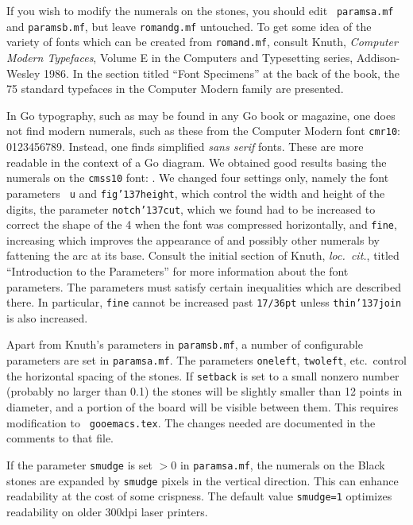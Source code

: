 If you wish to modify the numerals on the stones, you should edit {\tt
paramsa.mf} and {\tt paramsb.mf}, but leave {\tt romandg.mf} untouched. To get
some idea of the variety of fonts which can be created from {\tt romand.mf},
consult Knuth, {\it Computer Modern Typefaces}, Volume E in the Computers and
Typesetting series, Addison-Wesley 1986. In the section titled ``Font
Specimens'' at the back of the book, the 75 standard typefaces in the Computer
Modern family are presented.

In Go typography, such as may be found in any Go book or
magazine, one does not find modern numerals, such as these from the Computer
Modern font {\tt cmr10}: 0123456789. Instead, one finds simplified {\it sans
serif\/} fonts. These are more readable in the context of a Go diagram. We
obtained good results basing the numerals on the {\tt cmss10} font: {}.  We changed four settings only, namely the font parameters {\tt
u} and {\tt fig\char'137height}, which control the width and height of the
digits, the parameter {\tt notch\char'137cut}, which we found had to be
increased to correct the shape of the 4 when the font was compressed
horizontally, and {\tt fine}, increasing which improves the appearance
of  and possibly other numerals by fattening the
arc at its base. Consult the initial section of Knuth, {\it loc.\ cit.},
titled ``Introduction to the Parameters'' for more information about the font
parameters. The parameters must satisfy certain inequalities which are
described there. In particular, {\tt fine} cannot be increased past 
{\tt 17/36pt} unless {\tt thin\char'137join} is also increased.

Apart from Knuth's parameters in {\tt paramsb.mf}, a number of configurable
parameters are set in {\tt paramsa.mf}. The parameters {\tt oneleft}, 
{\tt twoleft}, etc.\ control the horizontal spacing of the stones. If 
{\tt setback} is set to a small nonzero number (probably no larger than 0.1)
the stones will be slightly smaller than 12 points in diameter, and a portion
of the board will be visible between them. This requires modification to {\tt
gooemacs.tex}.  The changes needed are documented in the comments to that
file. 

If the parameter {\tt smudge} is set $>0$ in {\tt paramsa.mf}, the numerals on
the Black stones are expanded by {\tt smudge} pixels in the vertical
direction. This can enhance readability at the cost of some crispness.
The default value {\tt smudge=1} optimizes readability on older
300dpi laser printers.


